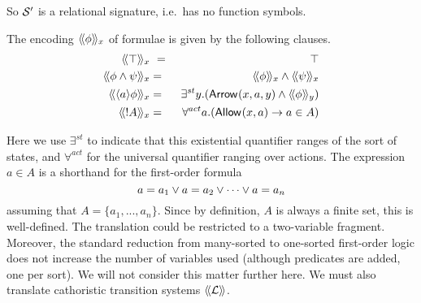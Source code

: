 \NI So $\mathcal{S}'$ is a relational signature, i.e.~has no function
symbols. 

\begin{definition}
The encoding $\langle\!\langle \phi \rangle\!\rangle_x$ of \cathoristic{} formulae is given by the following clauses.
\begin{eqnarray*}
  \SEMBTWO{\top}_x & \ = \ & \top
     \\
  \SEMBTWO{\phi \AND \psi}_x & = & \SEMBTWO{\phi}_x \AND \SEMBTWO{\psi}_x
     \\
  \SEMBTWO{\langle a \rangle \phi}_x & = & \exists^{st} y.(\ARROWTWO{}{x}{a}{y} \AND \SEMBTWO{\phi}_y)
     \\
  \SEMBTWO{\fBang A}_x & = & \forall^{act} a.(\ALLOWED{}{x}{a} \IMPLIES a \in A) 
\end{eqnarray*}

\end{definition}

\NI Here we use $\exists^{st}$ to indicate that this existential
quantifier ranges of the sort of states, and $\forall^{act}$ for the
universal quantifier ranging over actions. The expression $a \in A$ is
a shorthand for the first-order formula
\[
   a = a_1 \lor a = a_2 \lor \cdots \lor a = a_n
\]
assuming that $A = \{a_1, ..., a_n\}$. Since by definition, $A$ is
always a finite set, this is well-defined.  The translation could be
restricted to a two-variable fragment. Moreover, the standard
reduction from many-sorted to one-sorted first-order logic does not
increase the number of variables used (although predicates are added,
one per sort). We will not consider this matter further here.  We must
also translate cathoristic transition systems $\langle\!\langle \mathcal{L} \rangle\!\rangle$.

